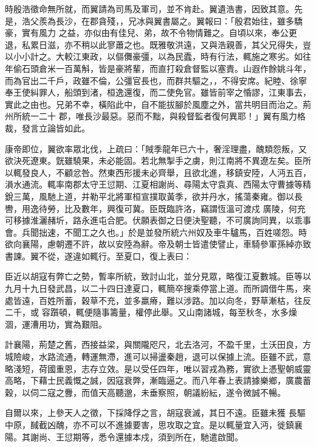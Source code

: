 \begin{pinyinscope}
 時殷浩徵命無所就，而翼請為司馬及軍司，並不肯赴。翼遺浩書，因致其意。先是，浩父羨為長沙，在郡貪殘，，兄冰與翼書屬之。翼報曰：「殷君始往，雖多驕豪，實有風力
 之益，亦似由有佳兒、弟，故不令物情難之。自頃以來，奉公更退，私累日滋，亦不稍以此寥蕭之也。既雅敬洪遠，又與浩親善，其父兄得失，豈以小小計之。大較江東政，以傴儛豪彊，以為民蠹，時有行法，輒施之寒劣。如往年偷石頭倉米一百萬斛，皆是豪將輩，而直打殺倉督監以塞責。山遐作餘姚斗年，而為官出二千戶，政雖不倫，公彊官長也，而群共驅之，，不得安席。紀睦、徐寧奉王使糾罪人，船頭到渚，桓逸還復，而二使免官。雖皆前宰之惛謬，江東事去，實此之由也。兄弟不幸，橫陷此中，自不能拔腳於風塵之外，當共明目而治之。荊州所統一二十
 郡，唯長沙最惡。惡而不黜，與殺督監者復何異耶！」翼有風力格裁，發言立論皆如此。



 康帝即位，翼欲率眾北伐，上疏曰：「賊季龍年已六十，奢淫理盡，醜類怨叛，又欲決死遼東。皝雖驍果，未必能固。若北無掣手之虜，則江南將不異遼左矣。臣所以輒發良人，不顧忿咎。然東西形援未必齊舉，且欲北進，移鎮安陸，人沔五百，溳水通流。輒率南郡太守王愆期、江夏相謝尚、尋陽太守袁真、西陽太守曹據等精銳三萬，風馳上道，并勒平北將軍桓宣撲取黃季，欲并丹水，搖蕩秦雍。御以長轡，用逸待勞，比及數年，興復可冀。臣既臨許洛，竊謂恆溫可渡戍
 廣陵，何充可移據淮灑赭圻，路永進屯合肥。伏願表御之日便決聖聽，不可廣詢同異，以乖事會。兵聞拙速，不聞工之久也。」於是並發所統六州奴及車牛驢馬，百姓嗟怨。時欲向襄陽，慮朝遷不許，故以安陸為辭。帝及朝士皆遣使譬止，車騎參軍孫綽亦致書諫。翼不從，遂違如輒行。至夏口，復上表曰：



 臣近以胡寇有弊亡之勢，暫率所統，致討山北，並分見眾，略復江夏數城。臣等以九月十九日發武昌，以二十四日達夏口，輒簡卒搜乘停當上道。而所調借牛馬，來處皆遠，百姓所蓄，穀草不充，並多羸瘠，難以涉路。加以向冬，野草漸枯，往反二千，或
 容躓頓，輒便隨事籌量，權停此舉。又山南諸城，每至秋冬，水多燥涸，運漕用功，實為艱阻。



 計襄陽，荊楚之舊，西接益梁，與關隴咫尺，北去洛河，不盈千里，土沃田良，方城險峻，水路流通，轉運無滯，進可以掃盪秦趙，退可以保據上流。臣雖不武，意略淺短，荷國重恩，志存立效。是以受任四年，唯以習戎為務，實欲上憑聖朝威靈高略，下藉士民義慨之誠，因寇衰弊，漸臨逼之。而八年春上表請據樂鄉，廣農蓄穀，以伺二寇之釁，而值天高聽邈，未垂察照，朝議紛紜，遂令微誠不暢。



 自爾以來，上參天人之徵，下採降俘之言，胡寇衰滅，其日不遠。臣雖未獲
 長驅中原，馘截凶醜，亦不可以不進據要害，思攻取之宜。是以輒量宜入沔，徙鎮襄陽。其謝尚、王愆期等，悉令還據本戍，須到所在，馳遣啟聞。




\end{pinyinscope}
